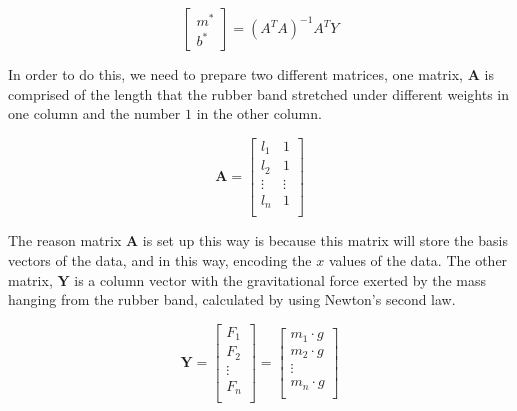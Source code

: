 \documentclass[10pt,letterpaper,onecolumn,report]{tau-class/tau}
\begin{document}
        \begin{equation}
            \begin{bmatrix}
            m^*\\
            b^*
            \end{bmatrix}
            =(A^TA)^{-1}A^TY
        \end{equation}

        In order to do this, we need to prepare two different matrices, one matrix, \(\textbf{A}\) is comprised of the length that the rubber band stretched under different weights in one column and the number \(1\) in the other column.

        \begin{equation}
            \textbf{A} =
            \begin{bmatrix}
            l_1 & 1\\
            l_2 & 1\\
            \vdots & \vdots\\
            l_n & 1\\
            \end{bmatrix}
        \end{equation}

        The reason matrix \(\textbf{A}\) is set up this way is because this matrix will store the basis vectors of the data, and in this way, encoding the \(x\) values of the data. The other matrix, \(\textbf{Y}\) is a column vector with the gravitational force exerted by the mass hanging from the rubber band, calculated by using Newton’s second law.

        \begin{equation}
            \textbf{Y} =
            \begin{bmatrix}
            F_1\\
            F_2\\
            \vdots\\
            F_n\\
            \end{bmatrix}
            =
            \begin{bmatrix}
            m_1 \cdot g\\
            m_2 \cdot g\\
            \vdots\\
            m_n \cdot g\\
            \end{bmatrix}
        \end{equation}        
\end{document}

